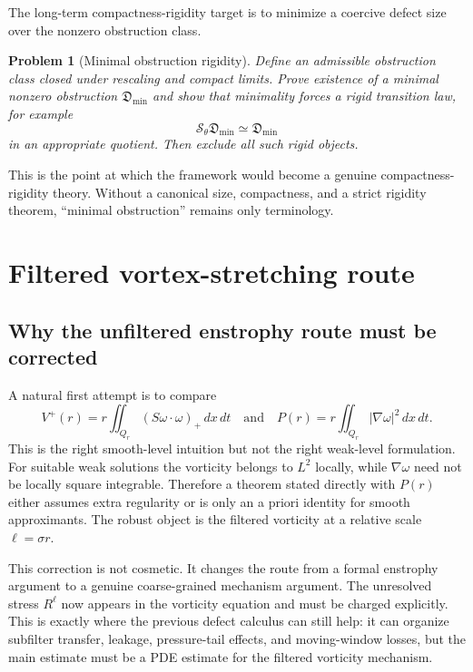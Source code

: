 \documentclass[11pt]{article}
\numberwithin{equation}{section}
\newtheorem{problem}[theorem]{Problem}
\theoremstyle{remark}
\newcommand{\dxdt}{\,dx\,dt}
\newcommand{\calS}{\mathcal S}
\begin{document}
The long-term compactness-rigidity target is to minimize a coercive defect size over the nonzero obstruction class.

\begin{problem}[Minimal obstruction rigidity]\label{prob:minimal-rigidity}
Define an admissible obstruction class closed under rescaling and compact limits. Prove existence of a minimal nonzero obstruction $\mathfrak D_{\min}$ and show that minimality forces a rigid transition law, for example
\begin{equation}\label{eq:scale-stationary}
\calS_\theta\mathfrak D_{\min}
\simeq
\mathfrak D_{\min}
\end{equation}
in an appropriate quotient. Then exclude all such rigid objects.
\end{problem}

This is the point at which the framework would become a genuine compactness-rigidity theory. Without a canonical size, compactness, and a strict rigidity theorem, ``minimal obstruction'' remains only terminology.


\section{Filtered vortex-stretching route}\label{sec:stretching-route}

\subsection{Why the unfiltered enstrophy route must be corrected}

A natural first attempt is to compare
\[
V^+(r)=r\iint_{Q_r}(S\omega\cdot\omega)_+\dxdt
\quad\text{and}\quad
P(r)=r\iint_{Q_r}|\nabla\omega|^2\dxdt.
\]
This is the right smooth-level intuition but not the right weak-level formulation. For suitable weak solutions the vorticity belongs to $L^2$ locally, while $\nabla\omega$ need not be locally square integrable. Therefore a theorem stated directly with $P(r)$ either assumes extra regularity or is only an a priori identity for smooth approximants. The robust object is the filtered vorticity at a relative scale $\ell=\sigma r$.

This correction is not cosmetic. It changes the route from a formal enstrophy argument to a genuine coarse-grained mechanism argument. The unresolved stress $R^\ell$ now appears in the vorticity equation and must be charged explicitly. This is exactly where the previous defect calculus can still help: it can organize subfilter transfer, leakage, pressure-tail effects, and moving-window losses, but the main estimate must be a PDE estimate for the filtered vorticity mechanism.
\end{document}

